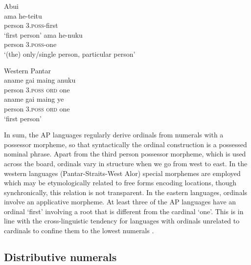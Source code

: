 \ea%
\label{bkm:Ref342651068}
{\upshape Abui}\\
\ea
\gll ama     he-teitu\\  
    person    3\textsc{.poss}-first  \\
\glt`first person'
\ex
\gll ama     he-nuku\\  
  person    3\textsc{.poss}-one  \\
\glt `(the) only/single person,  particular person'
\z\z

 


\ea%
\label{bkm:Ref342651067}
{\upshape Western Pantar}\\
 
\ea
\gll aname    gai  maing   anuku\\  
     person    3\textsc{.poss}   \textsc{ord} one\\ 
\ex
\gll aname    gai  maing   ye\\
    person    3\textsc{.poss}   \textsc{ord} one\\
\glt `first person'
\z\z
 

      

In sum, the AP languages regularly derive ordinals from numerals with a possessor morpheme, so that syntactically the ordinal construction is a possessed nominal phrase. Apart from the third person possessor morpheme, which is used across the board, ordinals vary in structure when we go from west to east. In the western languages (Pantar-Straits-West Alor) special morphemes are employed which may be etymologically related to free forms encoding locations, though synchronically, this relation is not transparent. In the eastern languages, ordinals involve an applicative morpheme. At least three of the AP languages have an ordinal `first' involving a root that is different from the cardinal `one'. This is in line with the cross-linguistic tendency for languages with ordinals unrelated to cardinals to confine them to the lowest numerals \citep{StolzEtAl2013}.

\subsection{Distributive numerals}
\label{sec:8:Distributive}
